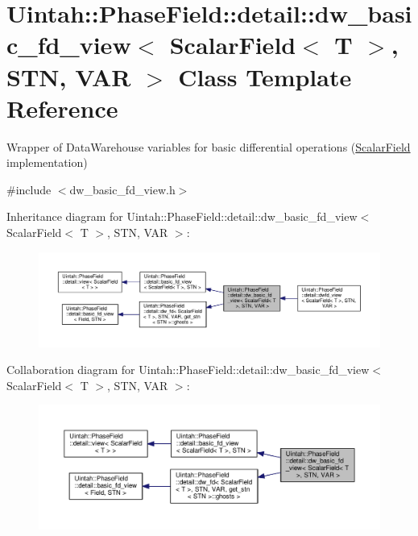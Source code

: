 \hypertarget{classUintah_1_1PhaseField_1_1detail_1_1dw__basic__fd__view_3_01ScalarField_3_01T_01_4_00_01STN_00_01VAR_01_4}{}\section{Uintah\+:\+:Phase\+Field\+:\+:detail\+:\+:dw\+\_\+basic\+\_\+fd\+\_\+view$<$ Scalar\+Field$<$ T $>$, S\+TN, V\+AR $>$ Class Template Reference}
\label{classUintah_1_1PhaseField_1_1detail_1_1dw__basic__fd__view_3_01ScalarField_3_01T_01_4_00_01STN_00_01VAR_01_4}


Wrapper of Data\+Warehouse variables for basic differential operations (\hyperlink{structUintah_1_1PhaseField_1_1ScalarField}{Scalar\+Field} implementation)  




{\ttfamily \#include $<$dw\+\_\+basic\+\_\+fd\+\_\+view.\+h$>$}



Inheritance diagram for Uintah\+:\+:Phase\+Field\+:\+:detail\+:\+:dw\+\_\+basic\+\_\+fd\+\_\+view$<$ Scalar\+Field$<$ T $>$, S\+TN, V\+AR $>$\+:\nopagebreak
\begin{figure}[H]
\begin{center}
\leavevmode
\includegraphics[width=350pt]{classUintah_1_1PhaseField_1_1detail_1_1dw__basic__fd__view_3_01ScalarField_3_01T_01_4_00_01STN_00_01VAR_01_4__inherit__graph}
\end{center}
\end{figure}


Collaboration diagram for Uintah\+:\+:Phase\+Field\+:\+:detail\+:\+:dw\+\_\+basic\+\_\+fd\+\_\+view$<$ Scalar\+Field$<$ T $>$, S\+TN, V\+AR $>$\+:\nopagebreak
\begin{figure}[H]
\begin{center}
\leavevmode
\includegraphics[width=350pt]{classUintah_1_1PhaseField_1_1detail_1_1dw__basic__fd__view_3_01ScalarField_3_01T_01_4_00_01STN_00_01VAR_01_4__coll__graph}
\end{center}
\end{figure}
